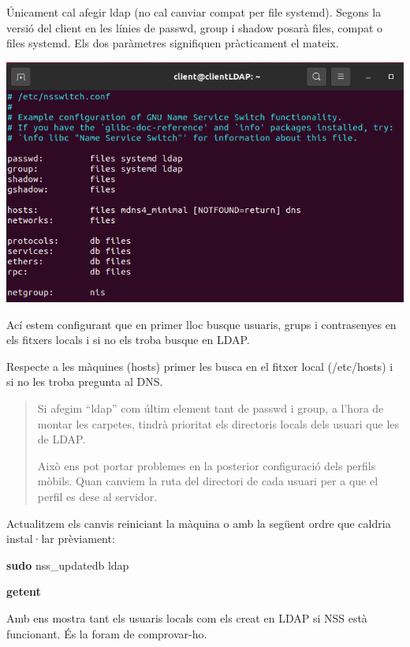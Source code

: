 \documentclass[
  12 pt,
  a4paper,
]{article}
\newenvironment{Shaded}{\begin{snugshade}}{\end{snugshade}}
\newcommand{\FunctionTok}[1]{\textcolor[rgb]{0.13,0.29,0.53}{\textbf{#1}}}
\newcommand{\NormalTok}[1]{#1}
\begin{document}
Únicament cal afegir ldap (no cal canviar compat per file systemd).
Segons la versió del client en les línies de passwd, group i shadow
posarà files, compat o files systemd. Els dos paràmetres signifiquen
pràcticament el mateix.

\includegraphics{png/libpam4.png}

Ací estem configurant que en primer lloc busque usuaris, grups i
contrasenyes en els fitxers locals i si no els troba busque en LDAP.

Respecte a les màquines (hosts) primer les busca en el fitxer local
(/etc/hosts) i si no les troba pregunta al DNS.

\begin{quote}
Si afegim ``ldap'' com últim element tant de passwd i group, a l'hora de
montar les carpetes, tindrà prioritat els directoris locals dels usuari
que les de LDAP.

Això ens pot portar problemes en la posterior configuració dels perfils
mòbils. Quan canviem la ruta del directori de cada usuari per a que el
perfil es dese al servidor.
\end{quote}

Actualitzem els canvis reiniciant la màquina o amb la següent ordre que
caldria instal·lar prèviament:

\begin{Shaded}
\begin{Highlighting}[]
\FunctionTok{sudo}\NormalTok{ nss\_updatedb ldap}
\end{Highlighting}
\end{Shaded}

\textbf{getent}

Amb ens mostra tant els usuaris locals com els creat en LDAP si NSS està
funcionant. És la foram de comprovar-ho.
\end{document}
